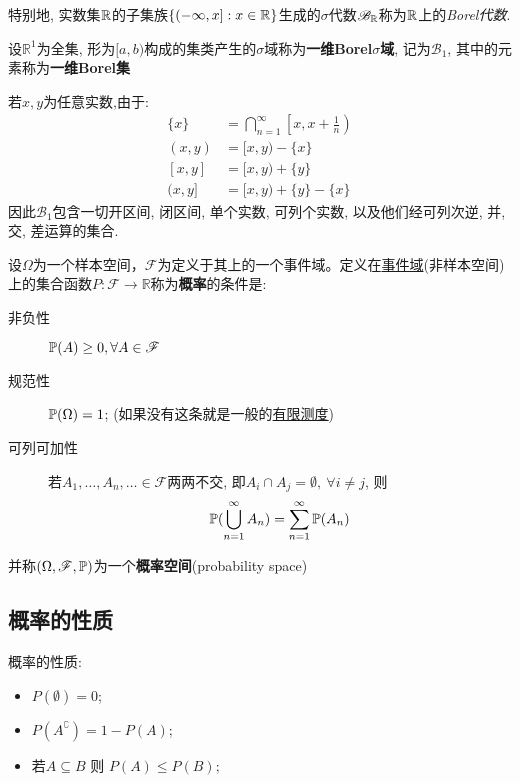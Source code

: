 特别地, 实数集$\R$的子集族$\{(-\infty,x] : x\in\R\}$生成的$\sigma$代数$\mathscr{B}_{\R}$称为$\R$上的\emph{Borel代数}.

\begin{definition}[Borel集]
    设$\mathbb{R}^1$为全集, 形为$[a,b)$构成的集类产生的$\sigma$域称为\textbf{一维Borel$\sigma$域}, 记为$\mathscr{B}_1$, 其中的元素称为\textbf{一维Borel集}
\end{definition}

若$x,y$为任意实数,由于:
\begin{align*}
    \{x\}  & =  \bigcap_{n=1}^{\infty}\left[x, x+\frac1{n}\right) \\
    (x, y) & =  [x, y)-\{x\}                                      \\
    [x, y] & =  [x, y)+\{y\}                                      \\
    (x, y] & =  [x, y)+\{y\}-\{x\}
\end{align*}
因此$\mathscr{B}_1$包含一切开区间, 闭区间, 单个实数, 可列个实数, 以及他们经可列次逆, 并, 交, 差运算的集合.

\begin{definition}[概率空间]
    设$\Omega$为一个样本空间，$\mathscr{F}$为定义于其上的一个事件域。定义在\underline{事件域}(非样本空间)上的集合函数$P : \mathscr{F} \to \mathbb{R}$称为\textbf{概率}的条件是:
    \begin{description}
        \item[非负性] $\P(A)\ge 0 , \forall A \in \mathscr{F}$
        \item[规范性] $\P(\Omega) = 1$; (如果没有这条就是一般的\underline{有限测度})
        \item[可列可加性] 若$A_{1},\dots,A_{n},\ldots \in \mathscr{F}$两两不交, 即$A_{i}\cap A_{j} = \emptyset, \ \forall i\neq j$, 则
            \[ \P(\bigcup_{n=1}^{\infty}A_{n}) = \sum_{n=1}^{\infty}\P(A_{n}) \]
    \end{description}
    并称$(\Omega,\mathscr{F},\P)$为一个\textbf{概率空间}(probability space)
\end{definition}

\subsection{概率的性质}

\begin{property}
    概率的性质:
    \begin{itemize}
        \item $P(\emptyset)=0$;
        \item $P(A^{\complement})=1-P(A)$;
        \item 若$A \subseteq B $ 则 $P(A)\le P(B)$;
    \end{itemize}
\end{property}

